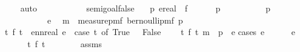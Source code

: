 \begin{isabellebody}
\ \ \isamarkupfalse%
\ auto\ \ \ \ \ \ \ \ \ \ \isanewline
{}\isamarkupfalse%
%
\endisatagproof
{\isafoldproof}%
%
\isadelimproof
\isanewline
%
\endisadelimproof
\isanewline
{}\isamarkupfalse%
\ semi{\isacharunderscore}{\kern0pt}goal{}{\isacharunderscore}{\kern0pt}false{\isacharcolon}{\kern0pt}\isanewline
\ \ \ p{}\ e{\isacharcolon}{\kern0pt}{\isacharcolon}{\kern0pt}real\ \ f\isanewline
\ \ \ \ {\isachardoublequoteopen}{}\ {\isasymle}\ p{}{\isachardoublequoteclose}\isanewline
\ \ \ \ \ \ \ \ \ \ {\isachardoublequoteopen}p{}\ {\isasymle}\ {}{\isachardoublequoteclose}\isanewline
\ \ \ \ \ \ \ \ \ \ {\isachardoublequoteopen}e\ {\isasymge}\ {}{\isachardoublequoteclose}\isanewline
{\isachardoublequoteopen}m\ {\isacharequal}{\kern0pt}\ measure{\isacharunderscore}{\kern0pt}pmf\ {\isacharparenleft}{\kern0pt}bernoulli{\isacharunderscore}{\kern0pt}pmf\ p{}{\isacharparenright}{\kern0pt}{\isachardoublequoteclose}\isanewline
{\isachardoublequoteopen}{\isasymAnd}t{\isachardot}{\kern0pt}\ f\ t\ {\isacharequal}{\kern0pt}\ ennreal\ e\ {\isacharasterisk}{\kern0pt}\ {\isacharparenleft}{\kern0pt}case\ t\ of\ True\ {\isasymRightarrow}\ {}{\isacharbar}{\kern0pt}\ False\ {\isasymRightarrow}\ {}{\isacharparenright}{\kern0pt}{\isachardoublequoteclose}\isanewline
{}\ {\isachardoublequoteopen}{\isasymintegral}\isactrlsup {\isacharplus}{\kern0pt}\ t{\isachardot}{\kern0pt}\ {\isacharparenleft}{\kern0pt}f\ t{\isacharparenright}{\kern0pt}\ {\isasympartial}m\ {\isacharequal}{\kern0pt}\ {\isacharparenleft}{\kern0pt}{}{\isacharminus}{\kern0pt}p{}{\isacharparenright}{\kern0pt}\ {\isacharasterisk}{\kern0pt}\ e{\isachardoublequoteclose}\isanewline
%
\isadelimproof
%
\endisadelimproof
%
\isatagproof
{}\isamarkupfalse%
{\isacharparenleft}{\kern0pt}cases\ {\isachardoublequoteopen}e\ {\isacharequal}{\kern0pt}\ {}{\isachardoublequoteclose}{\isacharparenright}{\kern0pt}\isanewline
\ \ \isamarkupfalse%
\ {\isachardoublequoteopen}e\ {\isacharequal}{\kern0pt}\ {}{\isachardoublequoteclose}\isanewline
\ \ \isamarkupfalse%
\ \isamarkupfalse%
\ {\isachardoublequoteopen}{\isasymAnd}t{\isachardot}{\kern0pt}\ f\ t\ {\isacharequal}{\kern0pt}\ {}{\isachardoublequoteclose}\isanewline
\ \ \ \ \isamarkupfalse%
\ assms\isanewline
\ \ \ \ \isamarkupfalse%

\end{isabellebody}
